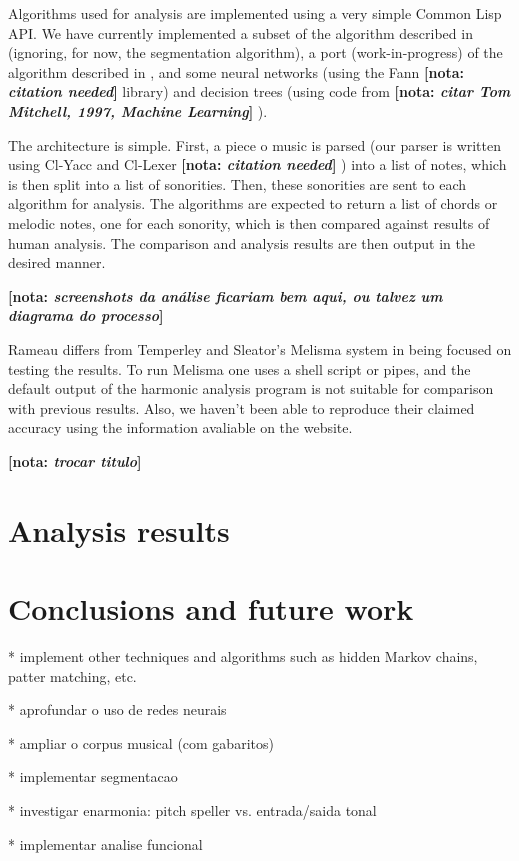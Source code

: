 \documentclass{article}
\newcommand{\nota}[1]{
  \textbf{[nota: \textit{#1}]}
}
\begin{document}
Algorithms used for analysis are implemented using a very simple
Common Lisp API. We have currently implemented a subset of the
algorithm described in \cite{pardo02:algorithms} (ignoring, for now,
the segmentation algorithm), a port (work-in-progress) of the
algorithm described in \cite{temperley99:modeling}, and some
neural networks (using the Fann \nota{citation needed} library) and
decision trees (using code from \nota{citar Tom Mitchell, 1997,
  Machine Learning}).

The architecture is simple. First, a piece o music is parsed (our
parser is written using Cl-Yacc and Cl-Lexer \nota{citation needed})
into a list of notes, which is then split into a list of
sonorities. Then, these sonorities are sent to each algorithm for
analysis. The algorithms are expected to return a list of chords or
melodic notes, one for each sonority, which is then compared against
results of human analysis. The comparison and analysis results are
then output in the desired manner.

\nota{screenshots da análise ficariam bem aqui, ou talvez um diagrama
  do processo}

Rameau differs from Temperley and Sleator's Melisma
\cite{temperley99:modeling} system in being focused on testing the
results. To run Melisma one uses a shell script or pipes, and the
default output of the harmonic analysis program is not suitable for
comparison with previous results. Also, we haven't been able to
reproduce their claimed accuracy using the information avaliable on
the website.
 
\nota{trocar titulo}

\section{Analysis results}
\label{sec:analysis-results}

\section{Conclusions and future work}
\label{sec:concl-future-work}


* implement other techniques and algorithms such as hidden Markov
chains, patter matching, etc.

* aprofundar o uso de redes neurais

* ampliar o corpus musical (com gabaritos)

* implementar segmentacao

* investigar enarmonia: pitch speller vs. entrada/saida tonal

* implementar analise funcional



\end{document}
